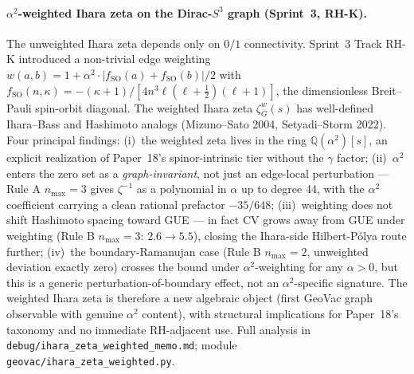 \documentclass[11pt]{article}
\begin{document}
\paragraph{$\alpha^2$-weighted Ihara zeta on the Dirac-$S^3$ graph
(Sprint~3, RH-K).}
The unweighted Ihara zeta depends only on $0/1$ connectivity. Sprint~3
Track RH-K introduced a non-trivial edge weighting
$w(a,b) = 1 + \alpha^2 \cdot |f_{\mathrm{SO}}(a) + f_{\mathrm{SO}}(b)|/2$
with $f_{\mathrm{SO}}(n,\kappa) = -(\kappa+1)/[4 n^3 \ell(\ell+\tfrac12)(\ell+1)]$,
the dimensionless Breit--Pauli spin-orbit diagonal. The weighted Ihara
zeta $\zeta_G^w(s)$ has well-defined Ihara--Bass and Hashimoto analogs
(Mizuno--Sato 2004, Setyadi--Storm 2022). Four principal findings:
(i)~the weighted zeta lives in the ring $\mathbb{Q}(\alpha^2)[s]$, an
explicit realization of Paper~18's spinor-intrinsic tier without the
$\gamma$ factor; (ii)~$\alpha^2$ enters the zero set as a
\emph{graph-invariant}, not just an edge-local perturbation --- Rule A
$n_{\max}=3$ gives $\zeta^{-1}$ as a polynomial in $\alpha$ up to
degree 44, with the $\alpha^2$ coefficient carrying a clean rational
prefactor $-35/648$; (iii)~weighting does not shift Hashimoto spacing
toward GUE --- in fact CV grows away from GUE under weighting (Rule
B $n_{\max}=3$: $2.6 \to 5.5$), closing the Ihara-side Hilbert-P\'olya
route further; (iv)~the boundary-Ramanujan case (Rule B $n_{\max}=2$,
unweighted deviation exactly zero) crosses the bound under
$\alpha^2$-weighting for any $\alpha > 0$, but this is a generic
perturbation-of-boundary effect, not an $\alpha^2$-specific signature.
The weighted Ihara zeta is therefore a new algebraic object
(first GeoVac graph observable with genuine $\alpha^2$ content), with
structural implications for Paper~18's taxonomy and no immediate
RH-adjacent use. Full analysis in
\texttt{debug/ihara\_zeta\_weighted\_memo.md}; module
\texttt{geovac/ihara\_zeta\_weighted.py}.
\end{document}
